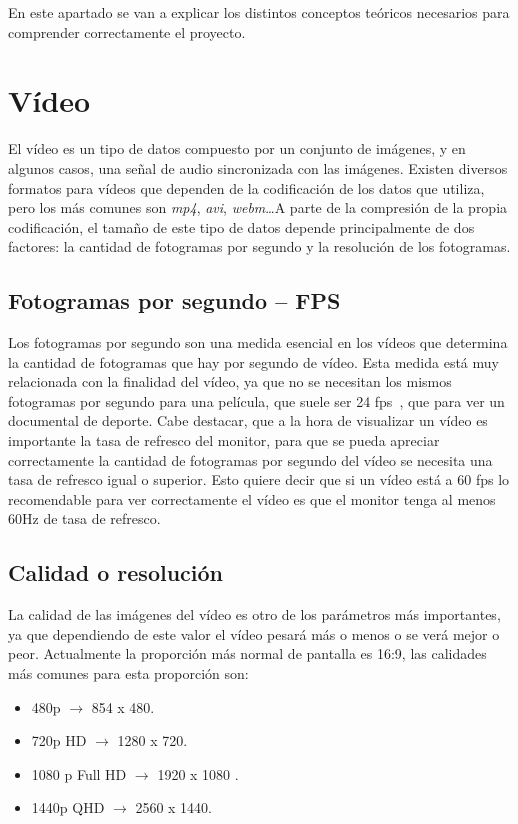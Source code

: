 
En este apartado se van a explicar los distintos conceptos teóricos necesarios para comprender correctamente el proyecto.

\section{Vídeo}
El vídeo es un tipo de datos compuesto por un conjunto de imágenes, y en algunos casos, una señal de audio sincronizada con las imágenes. Existen diversos formatos para vídeos que dependen de la codificación de los datos que utiliza, pero los más comunes son \textit{mp4}, \textit{avi}, \textit{webm}\ldots A parte de la compresión de la propia codificación, el tamaño de este tipo de datos depende principalmente de dos factores: la cantidad de fotogramas por segundo y la resolución de los fotogramas.
\subsection{Fotogramas por segundo -- FPS}
Los fotogramas por segundo son una medida esencial en los vídeos que determina la cantidad de fotogramas que hay por segundo de vídeo. Esta medida está muy relacionada con la finalidad del vídeo, ya que no se necesitan los mismos fotogramas por segundo para una película, que suele ser 24 fps~\cite{fpscine}, que para ver un documental de deporte. Cabe destacar, que a la hora de visualizar un vídeo es importante la tasa de refresco del monitor, para que se pueda apreciar correctamente la cantidad de fotogramas por segundo del vídeo se necesita una tasa de refresco igual o superior. Esto quiere decir que si un vídeo está a 60 fps lo recomendable para ver correctamente el vídeo es que el monitor tenga al menos 60Hz de tasa de refresco.
\subsection{Calidad o resolución}
La calidad de las imágenes del vídeo es otro de los parámetros más importantes, ya que dependiendo de este valor el vídeo pesará más o menos o se verá mejor o peor. Actualmente la proporción más normal de pantalla es 16:9, las calidades más comunes para esta proporción son:
\begin{itemize}
	\item 480p $\rightarrow$ 854 x 480.
	\item 720p HD $\rightarrow$ 1280 x 720.
	\item 1080 p Full HD $\rightarrow$ 1920 x 1080 .
	\item 1440p QHD $\rightarrow$ 2560 x 1440.
\end{itemize}
